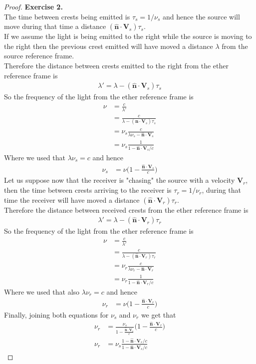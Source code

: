 \documentclass[11pt]{article}
\newcommand{\hatn}{\bm{\hat{n}}}
\theoremstyle{definition}
\begin{document}
\cleardoublepage
\begin{proof}{\textbf{Exercise 2.}}\\
The time between crests being emitted is $\tau_s = 1/\nu_s$ and hence the
source will move during that time a distance $(\hatn \cdot \bm{V}_s)\tau_s$.
\\
If we assume the light is being emitted to the right while the source is moving
to the right then the previous crest emitted will have moved a distance
$\lambda$ from the source reference frame.
\\
Therefore the distance between crests emitted to the right from the ether
reference frame is 
\begin{align*}
    \lambda' = \lambda - (\hatn \cdot \bm{V}_s)\tau_s
\end{align*}
So the frequency of the light from the ether reference frame is 
\begin{align*}
    \nu &= \frac{c}{\lambda'}\\
        &= \frac{c}{\lambda - (\hatn \cdot \bm{V}_s)\tau_s}\\
        &= \nu_s\frac{c}{\lambda\nu_s - \hatn \cdot \bm{V}_s}\\
        &= \nu_s\frac{1}{1 - \hatn \cdot \bm{V}_s/c}
\end{align*}
Where we used that $\lambda \nu_s = c$ and hence
\begin{align*}
    \nu_s &= \nu \bigg(1 - \frac{\hatn \cdot \bm{V}_s}{c}\bigg)
\end{align*}
Let us suppose now that the receiver is "chasing" the source with a velocity
$\bm{V}_r$, then the time between crests arriving to the receiver is
$\tau_r = 1/\nu_r$, during that time the receiver will have moved a distance
$(\hatn \cdot \bm{V}_r)\tau_r$.
\\
Therefore the distance between received crests from the ether reference frame
is 
\begin{align*}
    \lambda' = \lambda - (\hatn \cdot \bm{V}_r)\tau_r
\end{align*}
So the frequency of the light from the ether reference frame is
\begin{align*}
    \nu &= \frac{c}{\lambda'}\\
        &= \frac{c}{\lambda - (\hatn \cdot \bm{V}_r)\tau_r}\\
        &= \nu_r\frac{c}{\lambda\nu_r - \hatn \cdot \bm{V}_r}\\
        &= \nu_r\frac{1}{1 - \hatn \cdot \bm{V}_r/c}
\end{align*}
Where we used that also $\lambda \nu_r = c$ and hence
\begin{align*}
    \nu_r &= \nu \bigg(1 - \frac{\hatn \cdot \bm{V}_r}{c}\bigg)
\end{align*}
Finally, joining both equations for $\nu_s$ and $\nu_r$ we get that
\begin{align*}
    \nu_r &= \frac{\nu_s}{1 - \frac{\hatn \cdot \bm{V}_s}{c}}
    \bigg(1 - \frac{\hatn \cdot \bm{V}_r}{c}\bigg)\\[6pt]
    \nu_r &= \nu_s\frac{1 - \hatn \cdot \bm{V}_r/c}{1 - \hatn \cdot \bm{V}_s/c}
\end{align*}
\end{proof}
\end{document}
